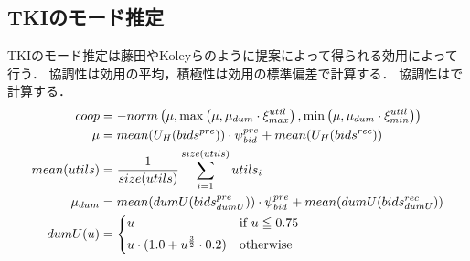 \subsection{TKIのモード推定}
TKIのモード推定は藤田\cite{tki-aa}やKoleyら\cite{tki-ha}のように提案によって得られる効用によって行う．
協調性は効用の平均，積極性は効用の標準偏差で計算する．
協調性はで計算する．
\begin{align}
    coop &= -norm \left(\mu, \max \left( \mu, \mu_{dum} \cdot \xi_{max}^{util}\right) , \min \left( \mu, \mu_{dum} \cdot \xi_{min}^{util} \right) \right) \label{eq:cooperativeness} \\
    \mu &= mean(U_H(bids^{pre})) \cdot \psi_{\mathit{bid}}^{pre} + mean(U_H(bids^{rec})) \nonumber \\
    mean(utils) &= \frac{1}{size(utils)}\sum_{i = 1}^{size(utils)} utils_i \nonumber \\
    \mu_{dum} &= mean(dumU(bids_{dumU}^{pre})) \cdot \psi_{\mathit{bid}}^{pre} + mean(dumU(bids_{dumU}^{rec})) \nonumber \\
    dumU(u) &=
    \begin{cases*}
        u & if $u \leqq 0.75$ \\
        u \cdot (1.0 + u^{\frac{3}{2}} \cdot 0.2) & otherwise \\
    \end{cases*} \label{eq:dummyMean}
\end{align}

